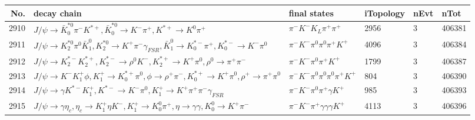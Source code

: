 \begin{table}[htbp] 
\begin{center}
\begin{small}
\begin{tabular}{rlllll}\hline\hline
 No. & decay chain & final states &  iTopology & nEvt & nTot \\\hline
2910&$J/\psi       \rightarrow \bar{K}_0^{*0}\pi^{-}        K^{*+}         , \bar{K}_0^{*0} \rightarrow K^{-}          \pi^{+}        , K^{*+}          \rightarrow K^{0}          \pi^{+}        $&$\pi^{-}        K^{-}          K_{L}          \pi^{+}        \pi^{+}        $& 2956&    3&406381\\
2911&$J/\psi       \rightarrow K_2^{*0}       \pi^{0}        \bar{K}_1^{0} , K_2^{*0}        \rightarrow K^{+}          \pi^{-}        \gamma_{FSR} , \bar{K}_1^{0}  \rightarrow K_{0}^{*-}     \pi^{+}        , K_{0}^{*-}      \rightarrow K^{-}          \pi^{0}        $&$\pi^{-}        K^{-}          \pi^{0}        \pi^{0}        \pi^{+}        K^{+}          $& 4096&    3&406384\\
2912&$J/\psi       \rightarrow K_2^{*-}       K_2^{*+}       , K_2^{*-}        \rightarrow \rho^{0}      K^{-}          , K_2^{*+}        \rightarrow K^{+}          \pi^{0}        , \rho^{0}       \rightarrow \pi^{+}        \pi^{-}        $&$\pi^{-}        K^{-}          \pi^{0}        \pi^{+}        K^{+}          $& 1799&    3&406387\\
2913&$J/\psi       \rightarrow K^{-}          K_1^{+}        \phi           , K_1^{+}         \rightarrow K_{0}^{*+}     \pi^{0}        , \phi            \rightarrow \rho^{+}      \pi^{-}        , K_{0}^{*+}      \rightarrow K^{+}          \pi^{0}        , \rho^{+}       \rightarrow \pi^{+}        \pi^{0}        $&$\pi^{-}        K^{-}          \pi^{0}        \pi^{0}        \pi^{0}        \pi^{+}        K^{+}          $&  804&    3&406390\\
2914&$J/\psi       \rightarrow \gamma       K^{*-}         K_1^{+}        , K^{*-}          \rightarrow K^{-}          \pi^{0}        , K_1^{+}         \rightarrow K^{+}          \pi^{+}        \pi^{-}        \gamma_{FSR} $&$\pi^{-}        K^{-}          \pi^{0}        \pi^{+}        \gamma       K^{+}          $&  985&    3&406393\\
2915&$J/\psi       \rightarrow \gamma       \eta_{c}    , \eta_{c}     \rightarrow K_1^{+}        \eta          K^{-}          , K_1^{+}         \rightarrow K_0^{0}        \pi^{+}        , \eta           \rightarrow \gamma       \gamma       , K_0^{0}         \rightarrow K^{+}          \pi^{-}        $&$\pi^{-}        K^{-}          \pi^{+}        \gamma       \gamma       \gamma       K^{+}          $& 4113&    3&406396\\

\end{tabular}
\end{small}
\end{center}
\end{table}
